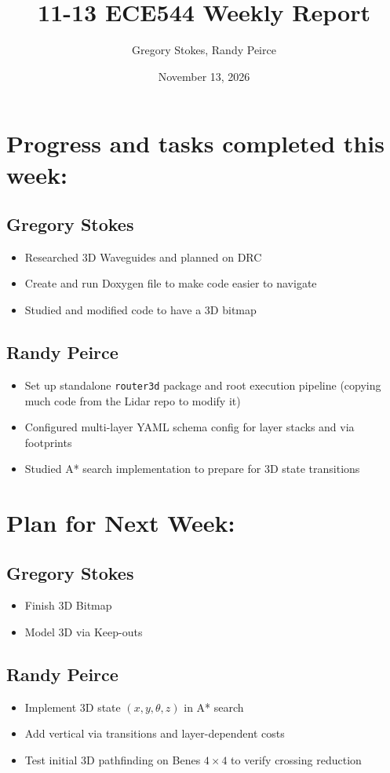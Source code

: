 \documentclass{article}
\title{11-13 ECE544 Weekly Report}
\author{Gregory Stokes, Randy Peirce}
\date{November 13, 2026}
\begin{document}
\maketitle

\section{Progress and tasks completed this week:}
\subsection{Gregory Stokes}
    \begin{itemize}
        \item Researched  3D Waveguides and planned on DRC
      \item Create and run Doxygen file to make code easier to navigate
      \item Studied and modified code to have a 3D bitmap
    \end{itemize}
\subsection{Randy Peirce}
    \begin{itemize}
        \item Set up standalone \texttt{router3d} package and root execution pipeline (copying much code from the Lidar repo to modify it)
        \item Configured multi-layer YAML schema config for layer stacks and via footprints
        \item Studied A* search implementation to prepare for 3D state transitions
    \end{itemize}

\section{Plan for Next Week:}
\subsection{Gregory Stokes}
    \begin{itemize}
        \item Finish 3D Bitmap
        \item Model 3D via Keep-outs
    \end{itemize}

\subsection{Randy Peirce}
    \begin{itemize}
        \item Implement 3D state $(x, y, \theta, z)$ in A* search
        \item Add vertical via transitions and layer-dependent costs
        \item Test initial 3D pathfinding on Benes $4\times4$ to verify crossing reduction
    \end{itemize}
\end{document}
